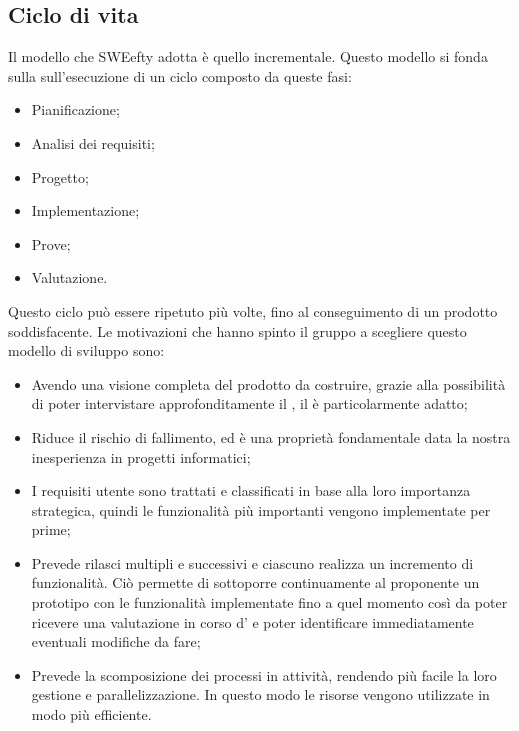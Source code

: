 	\subsection{Ciclo di vita}	
	Il modello che SWEefty adotta è quello incrementale. Questo modello si fonda sulla sull'esecuzione di un ciclo composto da queste fasi:
	\begin{itemize}
		\item Pianificazione;
		\item Analisi dei requisiti;
		\item Progetto;
		\item Implementazione;
		\item Prove;
		\item Valutazione.
	\end{itemize}
	Questo ciclo può essere ripetuto più volte, fino al conseguimento di un prodotto soddisfacente. Le motivazioni che hanno spinto il gruppo a scegliere questo modello di sviluppo sono:
	\begin{itemize}
		\item Avendo una visione completa del prodotto da costruire, grazie alla possibilità di poter intervistare approfonditamente il , il  è particolarmente adatto;
		\item Riduce il rischio di fallimento, ed è una proprietà fondamentale data la nostra inesperienza in progetti informatici;
		\item I requisiti utente sono trattati e classificati in base alla loro importanza strategica, quindi le funzionalità più importanti vengono implementate per prime;
		\item Prevede rilasci multipli e successivi e ciascuno realizza un incremento di funzionalità. Ciò permette di sottoporre continuamente al proponente un prototipo con le funzionalità implementate fino a quel momento così da poter ricevere una valutazione in corso d' e poter identificare immediatamente eventuali modifiche da fare;
		\item Prevede la scomposizione dei processi in attività, rendendo più facile la loro gestione e parallelizzazione. In questo modo le risorse vengono utilizzate in modo più efficiente.
	\end{itemize}
